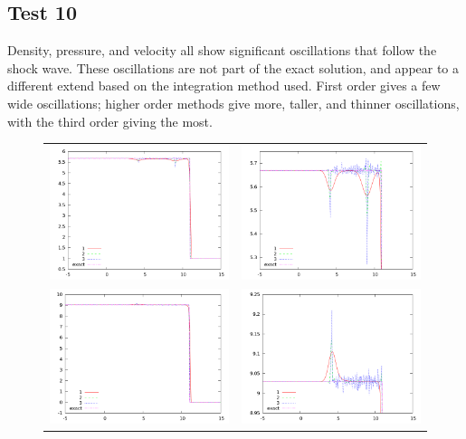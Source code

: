 \documentclass[10pt]{article}
\begin{document}
\clearpage

\subsection{Test 10}
Density, pressure, and velocity all show significant oscillations that follow the shock wave. These oscillations are not part of the exact solution, and appear to a different extend based on the integration method used. First order gives a few wide oscillations; higher order methods give more, taller, and thinner oscillations, with the third order giving the most. 
\begin{figure}[h]
  \begin{center}
	\begin{tabular}{cc}
      \includegraphics[width=.4\textwidth]{den_T10.png} &
	  \includegraphics[width=.4\textwidth]{den10zoom.png} \\
	  \includegraphics[width=.4\textwidth]{vel_T10.png} &	
	  \includegraphics[width=.4\textwidth]{vel10zoom.png} \\

\end{tabular}
\end{center}
\end{figure}
\end{document}
